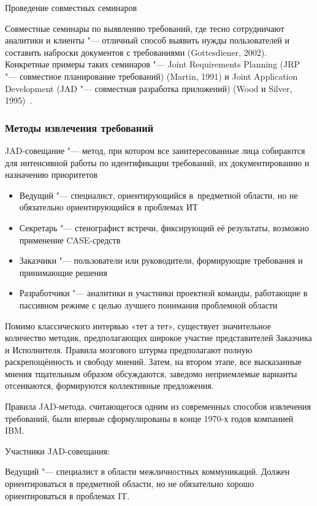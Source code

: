 \documentclass{../industrial-development}
\begin{document}
\alert{Проведение совместных семинаров}

Совместные семинары по выявлению требований, где тесно сотрудничают аналитики и клиенты "--- отличный способ выявить нужды пользователей и составить наброски документов с требованиями (Gottesdiener, 2002). Конкретные примеры таких семинаров "--- Joint Requirements Planning (JRP "--- совместное планирование требований) (Martin, 1991) и Joint Application Development (JAD "--- совместная разработка приложений) (Wood и Silver, 1995)~\cite[с.~47]{Wiegers}.


\begin{frame} \frametitle{Методы извлечения требований}
\alert{JAD-совещание} "--- метод, при котором все заинтересованные лица собираются для интенсивной работы по идентификации требований, их документированию и назначению приоритетов

  \begin{itemize} 
\item {Ведущий} "--- специалист, ориентирующийся в~предметной области, но не обязательно ориентирующийся в проблемах ИТ
\item {Секретарь} "--- стенографист встречи, фиксирующий её результаты, возможно применение CASE-средств
\item {Заказчики} "--- пользователи или руководители, формирующие требования и принимающие решения
\item {Разработчики} "--- аналитики и участники проектной команды, работающие в пассивном режиме с целью лучшего понимания проблемной области
\end{itemize}
\end{frame}

\lecturenotes

Помимо классического интервью «тет а тет», существует значительное количество методик, предполагающих широкое участие представителей Заказчика и Исполнителя. Правила мозгового штурма предполагают полную раскрепощённость и свободу мнений. Затем, на втором этапе, все высказанные мнения тщательным образом обсуждаются, заведомо неприемлемые варианты отсеиваются, формируются коллективные предложения.

Правила JAD-метода, считающегося одним из современных способов извлечения требований, были впервые сформулированы в конце 1970-х годов компанией IBM.

Участники JAD-совещания:

\alert{Ведущий} "--- специалист в области межличностных коммуникаций. Должен ориентироваться в предметной области, но не обязательно хорошо ориентироваться в проблемах IT.
\end{document}
